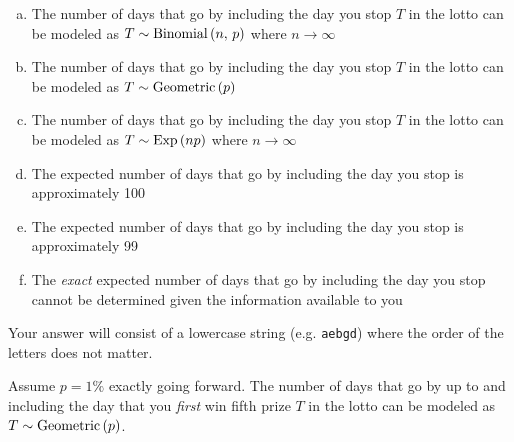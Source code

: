 \documentclass[12pt,landscape]{article}
\newcommand{\instr}{\small Your answer will consist of a lowercase string (e.g. \texttt{aebgd}) where the order of the letters does not matter. \normalsize}
\begin{document}
\vspace{-0.2cm}\benum{} 
\begin{enumerate}[(a)]
\item The number of days that go by including the day you stop $T$ in the lotto can be modeled as $T \sim \mathrm{Binomial}\left(n,\,p\right)$ where $n \rightarrow \infty$
\item The number of days that go by including the day you stop $T$ in the lotto can be modeled as $T \sim \mathrm{Geometric}\left(p\right)$
\item The number of days that go by including the day you stop $T$ in the lotto can be modeled as $T \sim \mathrm{Exp}\left(np\right)$ where $n \rightarrow \infty$ 
\item The expected number of days that go by including the day you stop is approximately 100 
\item The expected number of days that go by including the day you stop is approximately 99 
\item The \emph{exact} expected number of days that go by including the day you stop cannot be determined given the information available to you
\end{enumerate}
\eenum\instr\pagebreak


\problem{}  Assume $p=1\%$ exactly going forward. The number of days that go by up to and including the day that you \emph{first} win fifth prize $T$ in the lotto can be modeled as $T \sim \mathrm{Geometric}\left(p\right)$. 
\end{document}
